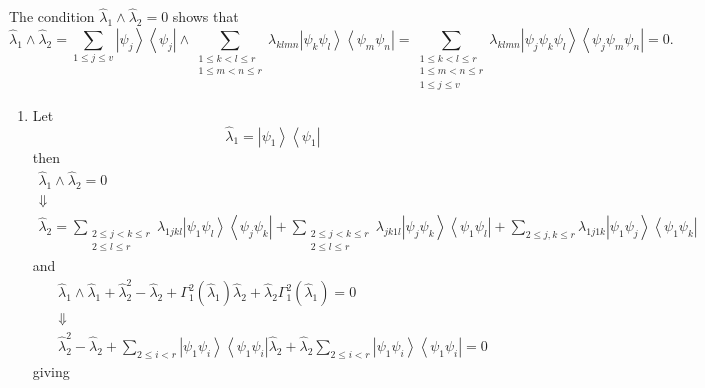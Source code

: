 \documentclass[aps,preprint]{revtex4}%
\begin{document}
The condition $\hat{\lambda}_{1}\wedge\hat{\lambda}_{2}=0$ shows that
\begin{equation}
\hat{\lambda}_{1}\wedge\hat{\lambda}_{2}=\sum_{1\leq j\leq v}\left\vert
\psi_{j}\right\rangle \left\langle \psi_{j}\right\vert \wedge\sum
_{\substack{1\leq k<l\leq r\\1\leq m<n\leq r}}\lambda_{klmn}\left\vert
\psi_{k}\psi_{l}\right\rangle \left\langle \psi_{m}\psi_{n}\right\vert
=\sum_{\substack{1\leq k<l\leq r\\1\leq m<n\leq r\\1\leq j\leq v}%
}\lambda_{klmn}\left\vert \psi_{j}\psi_{k}\psi_{l}\right\rangle \left\langle
\psi_{j}\psi_{m}\psi_{n}\right\vert =0.
\end{equation}


\begin{enumerate}
\item \bigskip Let
\begin{equation}
\hat{\lambda}_{1}=\left\vert \psi_{1}\right\rangle \left\langle \psi
_{1}\right\vert
\end{equation}
then
\begin{gather}
\hat{\lambda}_{1}\wedge\hat{\lambda}_{2}=0\\
\Downarrow\\
\hat{\lambda}_{2}=\sum_{\substack{2\leq j<k\leq r\\2\leq l\leq r}%
}\lambda_{1jkl}\left\vert \psi_{1}\psi_{l}\right\rangle \left\langle \psi
_{j}\psi_{k}\right\vert +\sum_{\substack{2\leq j<k\leq r\\2\leq l\leq
r}}\lambda_{jk1l}\left\vert \psi_{j}\psi_{k}\right\rangle \left\langle
\psi_{1}\psi_{l}\right\vert +\sum_{2\leq j,k\leq r}\lambda_{1j1k}\left\vert
\psi_{1}\psi_{j}\right\rangle \left\langle \psi_{1}\psi_{k}\right\vert
\end{gather}
and
\begin{gather}
\hat{\lambda}_{1}\wedge\hat{\lambda}_{1}+\hat{\lambda}_{2}^{2}-\hat{\lambda
}_{2}+\Gamma_{1}^{2}\left(  \hat{\lambda}_{1}\right)  \hat{\lambda}_{2}%
+\hat{\lambda}_{2}\Gamma_{1}^{2}\left(  \hat{\lambda}_{1}\right)  =0\\
\Downarrow\\
\hat{\lambda}_{2}^{2}-\hat{\lambda}_{2}+\sum_{2\leq i<r}\left\vert \psi
_{1}\psi_{i}\right\rangle \left\langle \psi_{1}\psi_{i}\right\vert
\hat{\lambda}_{2}+\hat{\lambda}_{2}\sum_{2\leq i<r}\left\vert \psi_{1}\psi
_{i}\right\rangle \left\langle \psi_{1}\psi_{i}\right\vert =0
\end{gather}
giving%
\begin{align}

\end{align}
\end{enumerate}
\end{document}
